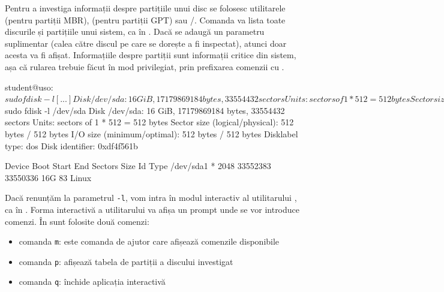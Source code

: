 Pentru a investiga informații despre partițiile unui disc se folosesc
utilitarele  (pentru partiții MBR),  (pentru partiții GPT) sau /. Comanda  va lista toate discurile și partițiile
unui sistem, ca în .
Dacă se adaugă un parametru suplimentar (calea către discul pe care se dorește a fi inspectat), atunci doar acesta va fi afișat.
Informațiile despre partiții sunt informații critice din sistem, așa că rularea trebuie făcut în mod privilegiat, prin prefixarea comenzii cu .

\begin{screen}[caption={Afișarea partițiilor (fdisk)},label={lst:storage:fdisk-list}]
student@uso:~$ sudo fdisk -l
[...]
Disk /dev/sda: 16 GiB, 17179869184 bytes, 33554432 sectors
Units: sectors of 1 * 512 = 512 bytes
Sector size (logical/physical): 512 bytes / 512 bytes
I/O size (minimum/optimal): 512 bytes / 512 bytes
Disklabel type: dos
Disk identifier: 0xdf4f561b

Device     Boot Start      End  Sectors Size Id Type
/dev/sda1  *     2048 33552383 33550336  16G 83 Linux

Disk /dev/sdb: 2 GiB, 2147483648 bytes, 4194304 sectors
Units: sectors of 1 * 512 = 512 bytes
Sector size (logical/physical): 512 bytes / 512 bytes
I/O size (minimum/optimal): 512 bytes / 512 bytes

student@uso:~$ sudo fdisk -l /dev/sda
Disk /dev/sda: 16 GiB, 17179869184 bytes, 33554432 sectors
Units: sectors of 1 * 512 = 512 bytes
Sector size (logical/physical): 512 bytes / 512 bytes
I/O size (minimum/optimal): 512 bytes / 512 bytes
Disklabel type: dos
Disk identifier: 0xdf4f561b

Device     Boot Start      End  Sectors Size Id Type
/dev/sda1  *     2048 33552383 33550336  16G 83 Linux
\end{screen}

Dacă renunțăm la parametrul \texttt{-l}, vom intra în modul interactiv al utilitarului , ca în .
Forma interactivă a utilitarului va afișa un prompt unde se vor introduce comenzi.
În  sunt folosite două comenzi:
\begin{itemize}
  \item comanda \texttt{m}: este comanda de ajutor care afișează comenzile disponibile
  \item comanda \texttt{p}: afișează tabela de partiții a discului investigat
  \item comanda \texttt{q}: închide aplicația interactivă 
\end{itemize}

